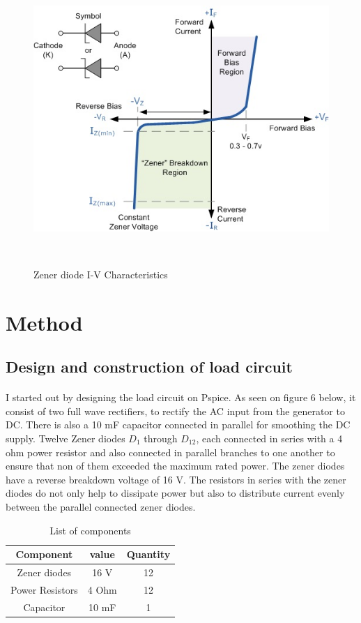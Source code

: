 \documentclass[titlepage]{article}
\begin{document}
\begin{figure}[h!]
\centering
\includegraphics[scale=0.8]{Zener-diode11.jpg}
\caption{Zener diode I-V Characteristics}~\cite{Electronicstutorialwebsite}
\label{Zener-diode11}
\end{figure}
\clearpage
\section{Method}
\subsection{Design and construction of load circuit}
\paragraph{}I started out by designing the load circuit on Pspice. As seen on figure 6 below, it consist of two full wave rectifiers, to rectify the AC input from the generator to DC. There is also a 10 mF capacitor connected in parallel for smoothing the DC supply.  Twelve Zener diodes $ D_1 $ through $ D_{12} $, each connected in series with a 4 ohm power resistor and also connected in parallel branches to one another to ensure that non of them exceeded the maximum rated power. The zener diodes have a reverse breakdown voltage of 16 V. The resistors in series with the zener diodes do not only help to dissipate power but also to distribute current evenly between the parallel connected zener diodes. 
\begin{table}[h]
\centering
\begin{tabular}{ |c|c|c| } 
 \hline
 Component & value & Quantity \\ 
 \hline
 Zener diodes & 16 V & 12 \\ 
 Power Resistors & 4 Ohm & 12 \\
 Capacitor & 10 mF & 1\\
 \hline
\end{tabular}
\caption{List of components}
\label{table:1}
\end{table}
\end{document}
